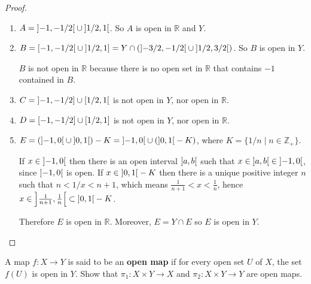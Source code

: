 \begin{proof}
    \begin{enumerate}[label={(\alph*)}]
        \item $A = \left]{-1, -1/2}\right[\cup \left]{1/2, 1}\right[$. So $A$ is open in $\mathbb{R}$ and $Y$.
        \item $B = \left[{-1, -1/2}\right[\cup \left]{1/2, 1}\right] = Y\cap (\left]{-3/2, -1/2}\right[\cup \left]{1/2, 3/2}\right[)$. So $B$ is open in $Y$.

              $B$ is not open in $\mathbb{R}$ because there is no open set in $\mathbb{R}$ that contains $-1$ contained in $B$.
        \item $C = \left]{-1, -1/2}\right]\cup\left[{1/2, 1}\right[$ is not open in $Y$, nor open in $\mathbb{R}$.
        \item $D = \left[{-1, -1/2}\right]\cup\left[{1/2, 1}\right]$ is not open in $Y$, nor open in $\mathbb{R}$.
        \item $E = (\left]{-1, 0}\right[\cup \left]{0, 1}\right[) - K = \left]{-1, 0}\right[ \cup (\left]{0, 1}\right[ - K)$, where $K = \{ 1/n \mid n\in\mathbb{Z}_{+} \}$.

              If $x\in \left]{-1, 0}\right[$ then there is an open interval $\left]{a, b}\right[$ such that $x\in \left]{a, b}\right[\in\left]{-1, 0}\right[$, since $\left]{-1, 0}\right[$ is open. If $x\in \left]{0, 1}\right[ - K$ then there is a unique positive integer $n$ such that $n < 1/x < n+1$, which means $\frac{1}{n+1} < x < \frac{1}{n}$, hence $x\in \left]{\frac{1}{n+1}, \frac{1}{n}}\right[\subset \left]{0, 1}\right[ - K$.

              Therefore $E$ is open in $\mathbb{R}$. Moreover, $E = Y\cap E$ so $E$ is open in $Y$.
    \end{enumerate}
\end{proof}

\begin{exercise}\label{chapter2:section16:exercise4}
    A map $f: X\to Y$ is said to be an \textbf{open map} if for every open set $U$ of $X$, the set $f(U)$ is open in $Y$. Show that $\pi_{1}: X\times Y\to X$ and $\pi_{2}: X\times Y\to Y$ are open maps.
\end{exercise}

